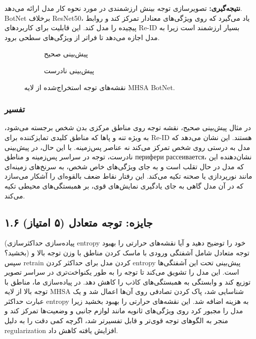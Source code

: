 \documentclass[12pt,a4paper]{article}
\theoremstyle{definition}
\begin{document}
\textbf{نتیجه‌گیری:}
تصویرسازی توجه بینش ارزشمندی در مورد نحوه کار مدل ارائه می‌دهد. BotNet برخلاف ResNet50، یاد می‌گیرد که روی ویژگی‌های معنادار تمرکز کند و روابط پیچیده را مدل کند. این قابلیت برای کاربردهای Re-ID بسیار ارزشمند است زیرا به مدل اجازه می‌دهد تا فراتر از ویژگی‌های سطحی برود.
\begin{figure}[H]
    \centering
    \begin{subfigure}[b]{0.45\textwidth}
        \centering
        \caption{پیش‌بینی صحیح}
    \end{subfigure}
    \hfill
    \begin{subfigure}[b]{0.45\textwidth}
        \centering
        \caption{پیش‌بینی نادرست}
    \end{subfigure}
    \caption{نقشه‌های توجه استخراج‌شده از لایه MHSA BotNet.}
    \label{fig:attention_maps}
\end{figure}

\subsubsection*{تفسیر}
در مثال پیش‌بینی صحیح، نقشه توجه روی مناطق مرکزی بدن شخص برجسته می‌شود، به ویژه تنه و پاها که مناطق کلیدی تمایزکننده برای Re-ID هستند. این نشان می‌دهد که مدل به درستی روی شخص تمرکز می‌کند نه عناصر پس‌زمینه. با این حال، در پیش‌بینی نادرست، توجه در سراسر پس‌زمینه و مناطق перифери рассеивается، نشان‌دهنده این که مدل در حال تقلب است و به جای ویژگی‌های خاص شخص، به سرنخ‌های زمینه‌ای مانند نورپردازی یا صحنه تکیه می‌کند. این رفتار نقاط ضعف بالقوه‌ای را آشکار می‌سازد که در آن مدل گاهی به جای یادگیری نمایش‌های قوی، بر همبستگی‌های محیطی تکیه می‌کند.

\subsection{۱.۶ جایزه: توجه متعادل (۵ امتیاز)}
(پیاده‌سازی حداکثر‌سازی entropy خود را توضیح دهید و آیا نقشه‌های حرارتی را بهبود بخشید؟)
توجه متعادل شامل آشفتگی ورودی با ماسک کردن مناطق با وزن توجه بالا و سپس retrain کردن مدل برای حداکثر کردن entropy پیش‌بینی تحت این آشفتگی‌ها است. این مدل را تشویق می‌کند تا توجه را به طور یکنواخت‌تری در سراسر تصویر توزیع کند و وابستگی به همبستگی‌های کاذب را کاهش دهد. در پیاده‌سازی ما، مناطق با توجه بالا از لایه MHSA شناسایی شد، پاک کردن تصادفی روی آن‌ها اعمال شد و یک عبارت حداکثر entropy به هزینه اضافه شد. این نقشه‌های حرارتی را بهبود بخشید زیرا مدل را مجبور کرد روی ویژگی‌های ثانویه مانند لوازم جانبی و وضعیت‌ها تمرکز کند و منجر به الگوهای توجه قوی‌تر و قابل تفسیرتر شد، اگرچه کمی دقت را به دلیل regularization افزایش یافته کاهش داد.
\end{document}

